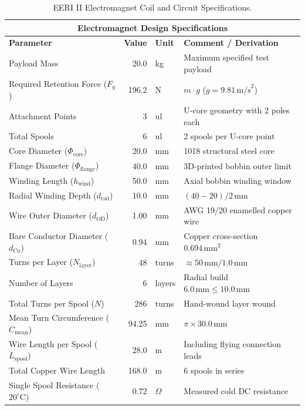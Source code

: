 \begin{table}[H]
  \centering
  \caption{EERI II Electromagnet Coil and Circuit Specifications.}
  \label{tab:app_eeri2_specs}
  \begin{tabular}{|l|r|l|l|}
    \hline
    \multicolumn{4}{|c|}{\textbf{Electromagnet Design Specifications}} \\
    \hline
    \textbf{Parameter} & \textbf{Value} & \textbf{Unit} & \textbf{Comment / Derivation} \\
    \hline
    Payload Mass & 20.0 & kg & Maximum specified test payload \\
    Required Retention Force ($F_g$) & 196.2 & N & $m \cdot g$ ($g = 9.81\,\text{m/s}^2$) \\
    Attachment Points & 3 & ul & U-core geometry with 2 poles each \\
    Total Spools & 6 & ul & 2 spools per U-core point \\
    Core Diameter ($\Phi_{\mathrm{core}}$) & 20.0 & mm & 1018 structural steel core \\
    Flange Diameter ($\Phi_{\mathrm{flange}}$) & 40.0 & mm & 3D-printed bobbin outer limit \\
    Winding Length ($h_{\mathrm{wind}}$) & 50.0 & mm & Axial bobbin winding window \\
    Radial Winding Depth ($d_{\mathrm{rad}}$) & 10.0 & mm & $(40 - 20)/2\,\text{mm}$ \\
    Wire Outer Diameter ($d_{\mathrm{OD}}$) & 1.00 & mm & AWG 19/20 enamelled copper wire \\
    Bare Conductor Diameter ($d_{\mathrm{Cu}}$) & 0.94 & mm & Copper cross-section $0.694\,\text{mm}^2$ \\
    Turns per Layer ($N_{\mathrm{layer}}$) & 48 & turns & $\approx 50\,\text{mm} / 1.0\,\text{mm}$ \\
    Number of Layers & 6 & layers & Radial build $6.0\,\text{mm} \le 10.0\,\text{mm}$ \\
    Total Turns per Spool ($N$) & 286 & turns & Hand-wound layer wound \\
    Mean Turn Circumference ($C_{\mathrm{mean}}$) & 94.25 & mm & $\pi \times 30.0\,\text{mm}$ \\
    Wire Length per Spool ($L_{\mathrm{spool}}$) & 28.0 & m & Including flying connection leads \\
    Total Copper Wire Length & 168.0 & m & 6 spools in series \\
    Single Spool Resistance ($20^\circ\text{C}$) & 0.72 & $\Omega$ & Measured cold DC resistance \\

\end{tabular}
\end{table}
